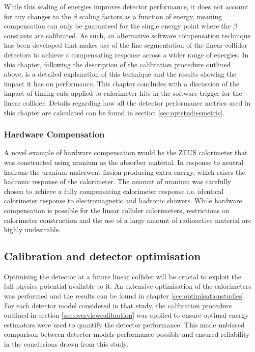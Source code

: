 While this scaling of energies improves detector performance, it does not account for any changes to the $\beta$ scaling factors as a function of energy, meaning compensation can only be guaranteed for the single energy point where the $\beta$ constants are calibrated.  As such, an alternative software compensation technique has been developed that makes use of the fine segmentation of the linear collider detectors to achieve a compensating response across a wider range of energies.  In this chapter, following the description of the calibration procedure outlined above, is a detailed explanation of this technique and the results showing the impact it has on performance.  This chapter concludes with a discussion of the impact of timing cuts applied to calorimeter hits in the software trigger for the linear collider.   Details regarding how all the detector performance metrics used in this chapter are calculated can be found in section \ref{sec:optstudiesmetric}.


\subsubsection{Hardware Compensation}
A novel example of hardware compensation would be the ZEUS calorimeter \cite{Derrick:1991tq} that was constructed using uranium as the absorber material.  In response to neutral hadrons the uranium underwent fission producing extra energy, which raises the hadronic response of the calorimeter.  The amount of uranium was carefully chosen to achieve a fully compensating calorimeter response i.e. identical calorimeter response to electromagnetic and hadronic showers.  While hardware compensation is possible for the linear collider calorimeters, restrictions on calorimeter construction and the use of a large amount of radioactive material are highly undesirable.  


\subsection{Calibration and detector optimisation}
Optimising the detector at a future linear collider will be crucial to exploit the full physics potential available to it.  An extensive optimisation of the calorimeters was performed and the results can be found in chapter \ref{sec:optimisationstudies}.  For each detector model considered in that study, the calibration procedure outlined in section \ref{sec:overviewcalibration} was applied to ensure optimal energy estimators were used to quantify the detector performance.  This made unbiased comparison between detector models performance possible and ensured reliability in the conclusions drawn from this study.

